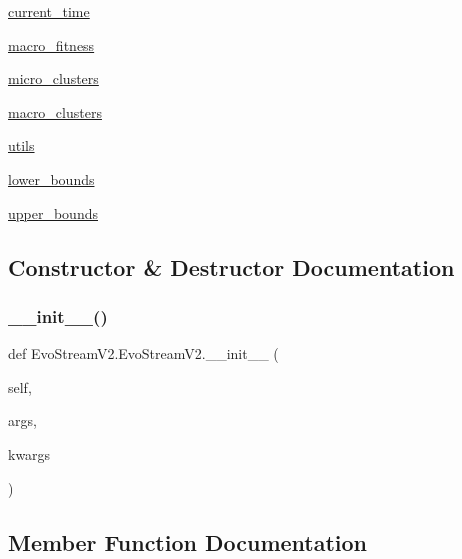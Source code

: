 \begin{DoxyCompactItemize}
\item 
\hyperlink{classEvoStreamV2_1_1EvoStreamV2_a1de6d98237493b1102c7fd39bf34b463}{current\+\_\+time}
\item 
\hyperlink{classEvoStreamV2_1_1EvoStreamV2_a81ac06c45e82d7df0249ed742d5d3e02}{macro\+\_\+fitness}
\item 
\hyperlink{classEvoStreamV2_1_1EvoStreamV2_a7099c5adec03cf57103f2eb583a0bfc7}{micro\+\_\+clusters}
\item 
\hyperlink{classEvoStreamV2_1_1EvoStreamV2_a32181cdcabace64105523c0a714ba13e}{macro\+\_\+clusters}
\item 
\hyperlink{classEvoStreamV2_1_1EvoStreamV2_a946cdc392f4193ce8f327195dce97a60}{utils}
\item 
\hyperlink{classEvoStreamV2_1_1EvoStreamV2_a0ab157ebfede38895e387f7c02e54269}{lower\+\_\+bounds}
\item 
\hyperlink{classEvoStreamV2_1_1EvoStreamV2_a8a1cb8aef683f5cb0b414f81a1cb4eb5}{upper\+\_\+bounds}
\end{DoxyCompactItemize}


\subsection{Constructor \& Destructor Documentation}
\mbox{\label{classEvoStreamV2_1_1EvoStreamV2_abb132ec68b69e9c110cfa8dda41c5883}} 
\subsubsection{\texorpdfstring{\+\_\+\+\_\+init\+\_\+\+\_\+()}{\_\_init\_\_()}}
{\footnotesize\ttfamily def Evo\+Stream\+V2.\+Evo\+Stream\+V2.\+\_\+\+\_\+init\+\_\+\+\_\+ (\begin{DoxyParamCaption}\item[{}]{self,  }\item[{}]{args,  }\item[{}]{kwargs }\end{DoxyParamCaption})}



\subsection{Member Function Documentation}
\mbox{\label{classEvoStreamV2_1_1EvoStreamV2_a9e3a46ef52e2558c648383f9ade1b0ce}} 
